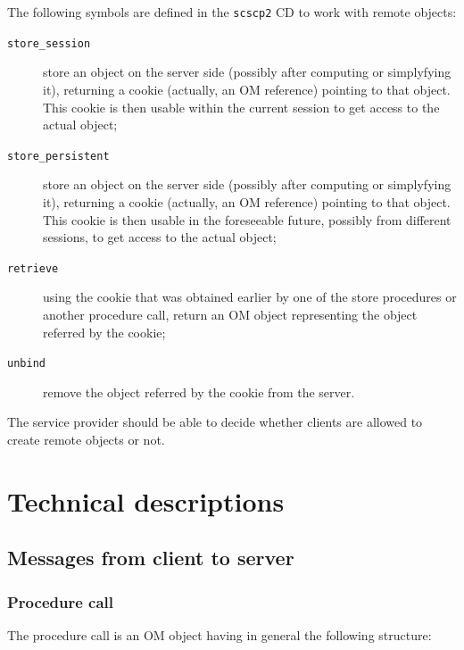 \documentclass{amsart}
\begin{document}
The following symbols are defined in the \verb|scscp2| CD \cite{scscp2} 
to work with remote objects:
\begin{description}
\item[\tt{store\_session}] store an object on the server side (possibly
after computing or simplyfying it), 
returning a cookie (actually, an OM reference) pointing to that object.
This cookie is then usable within the current session to get access
to the actual object;
\item[\tt{store\_persistent}] store an object on the server side (possibly
after computing or simplyfying it), 
returning a cookie (actually, an OM reference) pointing to that object.
This cookie is then usable in the foreseeable future, possibly from 
different sessions, to get access to the actual object;
\item[\tt{retrieve}] using the cookie that was obtained earlier by 
one of the store procedures or another procedure call, return 
an OM object representing the object referred by the cookie; 
\item[\tt{unbind}] remove the object referred by the cookie from the server. 
\end{description}
The service provider should be able to decide whether clients are
allowed to create remote objects or not.

\section{Technical descriptions}\label{tech}

\subsection{Messages from client to server}

\subsubsection{Procedure call}

The procedure call is an OM object having in general
the following structure:
\end{document}
